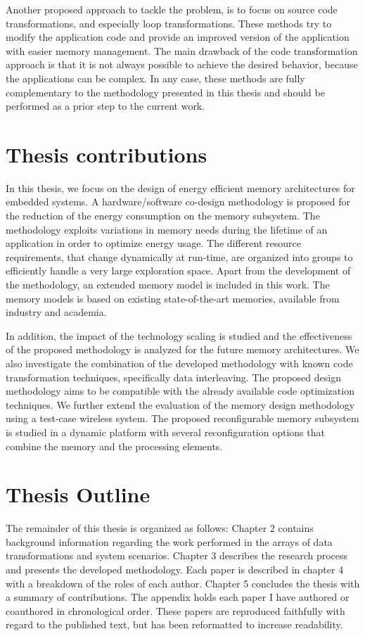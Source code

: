 Another proposed approach to tackle the problem, is to focus on source code transformations, and especially loop transformations.
These methods try to modify the application code and provide an improved version of the application with easier memory management.
The main drawback of the code transformation approach is that it is not always possible to achieve the desired behavior, because the applications can be complex.
In any case, these methods are fully complementary to the methodology presented in this thesis and should be performed as a prior step to the current work. 

\section{Thesis contributions}

In this thesis, we focus on the design of energy efficient memory architectures for embedded systems.
A hardware/software co-design methodology is proposed for the reduction of the energy consumption on the memory subsystem. 
The  methodology exploits variations in memory needs during the lifetime of an application in order to optimize energy usage. 
The different resource requirements, that change dynamically at run-time, are organized into groups to efficiently handle a very large exploration space.
Apart from the development of the methodology, an extended memory model is included in this work. 
The memory models is based on existing state-of-the-art memories, available from industry and academia.

In addition, the impact of the technology scaling is studied and the effectiveness of the proposed methodology is analyzed for the future memory architectures.
We also investigate the combination of the developed methodology with known code transformation techniques, specifically data interleaving.
The proposed design methodology aims to be compatible with the already available code optimization techniques.
We further extend the evaluation of the memory design methodology using a test-case wireless system.
The proposed reconfigurable memory subsystem is studied in a dynamic platform with several reconfiguration options that combine the memory and the processing elements.

\section{Thesis Outline}

The remainder of this thesis is organized as follows: Chapter 2 contains background information regarding the work performed in the arrays of data transformations and system scenarios. 
Chapter 3 describes the research process and presents the developed methodology.
Each paper is described in chapter 4 with a breakdown of the roles of each author. 
Chapter 5 concludes the thesis with a summary of contributions. 
The appendix holds each paper I have authored or coauthored in chronological order. 
These papers are reproduced faithfully with regard to the published text, but has been reformatted to increase readability.

